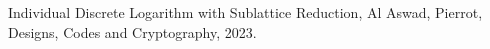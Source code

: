 \documentclass[preview]{standalone}
\begin{document}
Individual Discrete Logarithm with Sublattice Reduction, Al Aswad, Pierrot, Designs, Codes and Cryptography, 2023.\\
\end{document}
